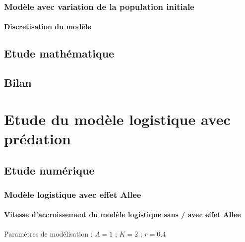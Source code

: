 \documentclass{article}
\begin{document}
\paragraph{}

\subsubsection{Modèle avec variation de la population initiale}

\paragraph{Discretisation du modèle}
\begin{center}
\end{center}


\newpage

\subsection{Etude mathématique}


\subsection{Bilan}
\paragraph{}

\newpage
\section{Etude du modèle logistique avec prédation}

\subsection{Etude numérique}

\subsubsection{Modèle logistique avec effet Allee}

\paragraph{Vitesse d'accroissement du modèle logistique sans / avec effet Allee}
\begin{center}
\end{center}
Paramètres de modélisation : $A=1$  ; $K=2$  ; $r=0.4$
\end{document}
